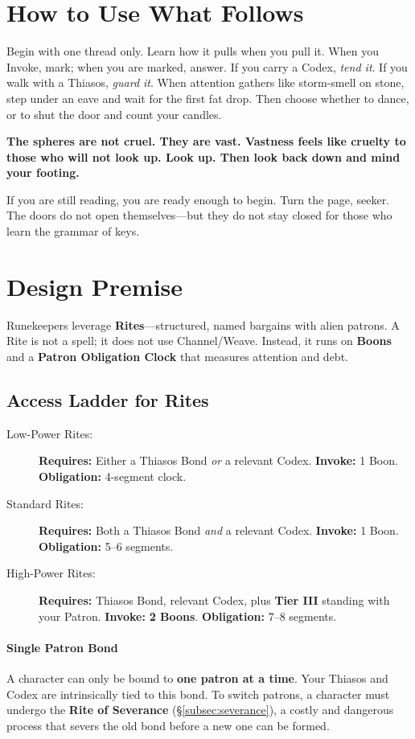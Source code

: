 \documentclass[12pt,twoside]{book}
\newcommand{\whisper}[1]{\textbf{#1}}
\begin{document}
\section*{How to Use What Follows}
Begin with one thread only. Learn how it pulls when you pull it. When you Invoke, mark; when you are marked, answer. If you carry a Codex, \emph{tend it}. If you walk with a Thiasos, \emph{guard it}. When attention gathers like storm-smell on stone, step under an eave and wait for the first fat drop. Then choose whether to dance, or to shut the door and count your candles.

\whisper{The spheres are not cruel. They are vast. Vastness feels like cruelty to those who will not look up. Look up. Then look back down and mind your footing.}

If you are still reading, you are ready enough to begin. Turn the page, seeker. The doors do not open themselves—but they do not stay closed for those who learn the grammar of keys.

\section{Design Premise}
Runekeepers leverage \textbf{Rites}---structured, named bargains with alien patrons. A Rite is not a spell; it does not use Channel/Weave. Instead, it runs on \textbf{Boons} and a \textbf{Patron Obligation Clock} that measures attention and debt.

\subsection*{Access Ladder for Rites}
\begin{description}
  \item[Low-Power Rites:] \textbf{Requires:} Either a Thiasos Bond \emph{or} a relevant Codex. \textbf{Invoke:} 1 Boon. \textbf{Obligation:} 4-segment clock.
  \item[Standard Rites:] \textbf{Requires:} Both a Thiasos Bond \emph{and} a relevant Codex. \textbf{Invoke:} 1 Boon. \textbf{Obligation:} 5–6 segments.
  \item[High-Power Rites:] \textbf{Requires:} Thiasos Bond, relevant Codex, plus \textbf{Tier III} standing with your Patron. \textbf{Invoke:} \textbf{2 Boons}. \textbf{Obligation:} 7–8 segments.
\end{description}

\paragraph{Single Patron Bond}
A character can only be bound to \textbf{one patron at a time}. Your Thiasos and Codex are intrinsically tied to this bond. To switch patrons, a character must undergo the \textbf{Rite of Severance} (\S\ref{subsec:severance}), a costly and dangerous process that severs the old bond before a new one can be formed.
\end{document}
